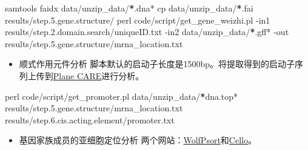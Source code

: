 \documentclass[
  10pt,
]{book}
\newenvironment{Shaded}{\begin{snugshade}}{\end{snugshade}}
\newcommand{\ErrorTok}[1]{\textcolor[rgb]{0.64,0.00,0.00}{\textbf{#1}}}
\newcommand{\FloatTok}[1]{\textcolor[rgb]{0.00,0.00,0.81}{#1}}
\newcommand{\NormalTok}[1]{#1}
\newcommand{\SpecialCharTok}[1]{\textcolor[rgb]{0.00,0.00,0.00}{#1}}
\providecommand{\tightlist}{%
  \setlength{\itemsep}{0pt}\setlength{\parskip}{0pt}}
\begin{document}
\begin{Shaded}
\begin{Highlighting}[]
\NormalTok{samtools faidx data}\SpecialCharTok{/}\NormalTok{unzip\_data}\SpecialCharTok{/}\ErrorTok{*}\NormalTok{.dna}\SpecialCharTok{*}
\NormalTok{cp data}\SpecialCharTok{/}\NormalTok{unzip\_data}\SpecialCharTok{/}\ErrorTok{*}\NormalTok{.fai results}\SpecialCharTok{/}\NormalTok{step.}\FloatTok{5.}\NormalTok{gene.structure}\SpecialCharTok{/}
\NormalTok{perl code}\SpecialCharTok{/}\NormalTok{script}\SpecialCharTok{/}\NormalTok{get\_gene\_weizhi.pl }\SpecialCharTok{{-}}\NormalTok{in1 results}\SpecialCharTok{/}\NormalTok{step.}\FloatTok{2.}\NormalTok{domain.search}\SpecialCharTok{/}\NormalTok{uniqueID.txt }\SpecialCharTok{{-}}\NormalTok{in2 data}\SpecialCharTok{/}\NormalTok{unzip\_data}\SpecialCharTok{/}\ErrorTok{*}\NormalTok{.gff}\SpecialCharTok{*} \SpecialCharTok{{-}}\NormalTok{out results}\SpecialCharTok{/}\NormalTok{step.}\FloatTok{5.}\NormalTok{gene.structure}\SpecialCharTok{/}\NormalTok{mrna\_location.txt}
\end{Highlighting}
\end{Shaded}

\begin{itemize}
\tightlist
\item
  顺式作用元件分析
  脚本默认的启动子长度是1500bp。将提取得到的启动子序列上传到\href{https://bioinformatics.psb.ugent.be/webtools/plantcare/html/}{Plane CARE}进行分析。
\end{itemize}

\begin{Shaded}
\begin{Highlighting}[]
\NormalTok{perl code}\SpecialCharTok{/}\NormalTok{script}\SpecialCharTok{/}\NormalTok{get\_promoter.pl data}\SpecialCharTok{/}\NormalTok{unzip\_data}\SpecialCharTok{/}\ErrorTok{*}\NormalTok{dna.top}\SpecialCharTok{*}\NormalTok{ results}\SpecialCharTok{/}\NormalTok{step.}\FloatTok{5.}\NormalTok{gene.structure}\SpecialCharTok{/}\NormalTok{mrna\_location.txt results}\SpecialCharTok{/}\NormalTok{step.}\FloatTok{6.}\NormalTok{cis.acting.element}\SpecialCharTok{/}\NormalTok{promoter.txt}
\end{Highlighting}
\end{Shaded}

\begin{itemize}
\tightlist
\item
  基因家族成员的亚细胞定位分析
  两个网站：\href{https://wolfpsort.hgc.jp/}{WolfPsort}和\href{http://cello.life.nctu.edu.tw/}{Cello}。
\end{itemize}
\end{document}
